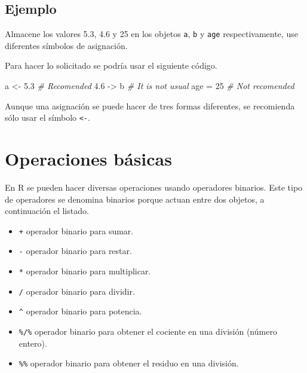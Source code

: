 \documentclass[10pt,]{krantz}
\makeatletter
\newenvironment{Shaded}{\begin{snugshade}}{\end{snugshade}}
\newcommand{\DecValTok}[1]{\textcolor[rgb]{0.00,0.00,0.81}{{#1}}}
\newcommand{\FloatTok}[1]{\textcolor[rgb]{0.00,0.00,0.81}{{#1}}}
\newcommand{\StringTok}[1]{\textcolor[rgb]{0.31,0.60,0.02}{{#1}}}
\newcommand{\CommentTok}[1]{\textcolor[rgb]{0.56,0.35,0.01}{\textit{{#1}}}}
\newcommand{\NormalTok}[1]{{#1}}
\providecommand{\tightlist}{%
  \setlength{\itemsep}{0pt}\setlength{\parskip}{0pt}}
\let\proglang=\textsf
\newenvironment{kframe}{%
\medskip{}
\setlength{\fboxsep}{.8em}
 \def\at@end@of@kframe{}%
 \ifinner\ifhmode%
  \def\at@end@of@kframe{\end{minipage}}%
  \begin{minipage}{\columnwidth}%
 \fi\fi%
 \def\FrameCommand##1{\hskip\@totalleftmargin \hskip-\fboxsep
 \colorbox{shadecolor}{##1}\hskip-\fboxsep
     \hskip-\linewidth \hskip-\@totalleftmargin \hskip\columnwidth}%
 \MakeFramed {\advance\hsize-\width
   \@totalleftmargin\z@ \linewidth\hsize
   \@setminipage}}%
 {\par\unskip\endMakeFramed%
 \at@end@of@kframe}
\renewenvironment{Shaded}{\begin{kframe}}{\end{kframe}}
\let\BeginKnitrBlock\begin \let\EndKnitrBlock\end
\makeatother
\begin{document}
\subsection*{Ejemplo}\label{ejemplo-5}


Almacene los valores 5.3, 4.6 y 25 en los objetos \texttt{a}, \texttt{b}
y \texttt{age} respectivamente, use diferentes símbolos de asignación.

Para hacer lo solicitado se podría usar el siguiente código.

\begin{Shaded}
\begin{Highlighting}[]
\NormalTok{a <-}\StringTok{ }\FloatTok{5.3} \CommentTok{# Recomended}
\FloatTok{4.6} \NormalTok{->}\StringTok{ }\NormalTok{b }\CommentTok{# It is not usual}
\NormalTok{age =}\StringTok{ }\DecValTok{25} \CommentTok{# Not recomended}
\end{Highlighting}
\end{Shaded}

\BeginKnitrBlock{rmdimportant}
Aunque una asignación se puede hacer de tres formas diferentes, se
recomienda sólo usar el símbolo \texttt{\textless{}-}.
\EndKnitrBlock{rmdimportant}

\section{\texorpdfstring{Operaciones básicas
}{Operaciones básicas }}\label{operaciones-basicas}

En \proglang{R} se pueden hacer diversas operaciones usando operadores
binarios. Este tipo de operadores se denomina binarios porque actuan
entre dos objetos, a continuación el listado.

\begin{itemize}
\tightlist
\item
  \texttt{+} operador binario para sumar.
\item
  \texttt{-} operador binario para restar.
\item
  \texttt{*} operador binario para multiplicar.
\item
  \texttt{/} operador binario para dividir.
\item
  \texttt{\^{}} operador binario para potencia.
\item
  \texttt{\%/\%} operador binario para obtener el cociente en una
  división (número entero).
\item
  \texttt{\%\%} operador binario para obtener el residuo en una
  división.
\end{itemize}
\end{document}
